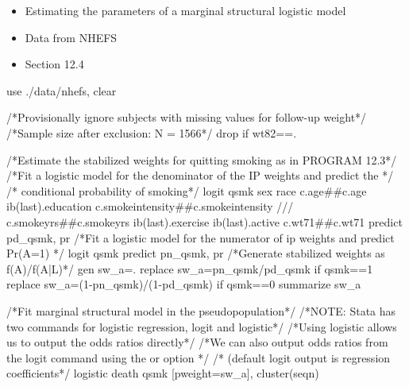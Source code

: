 \documentclass[
  10pt,
  a4paper,
]{book}
\newenvironment{Shaded}{\begin{snugshade}}{\end{snugshade}}
\newcommand{\AlertTok}[1]{\textcolor[rgb]{0.68,0.00,0.00}{#1}}
\newcommand{\CommentTok}[1]{\textcolor[rgb]{0.37,0.37,0.37}{#1}}
\newcommand{\FunctionTok}[1]{\textcolor[rgb]{0.28,0.35,0.67}{#1}}
\newcommand{\KeywordTok}[1]{\textcolor[rgb]{0.00,0.46,0.62}{#1}}
\newcommand{\NormalTok}[1]{\textcolor[rgb]{0.00,0.46,0.62}{#1}}
\providecommand{\tightlist}{%
  \setlength{\itemsep}{0pt}\setlength{\parskip}{0pt}}
\begin{document}
\begin{itemize}
\tightlist
\item
  Estimating the parameters of a marginal structural logistic model
\item
  Data from NHEFS
\item
  Section 12.4
\end{itemize}

\begin{Shaded}
\begin{Highlighting}[]
\KeywordTok{use}\NormalTok{ ./}\KeywordTok{data}\NormalTok{/nhefs, }\KeywordTok{clear}

\CommentTok{/*Provisionally ignore subjects with missing values for follow{-}up weight*/}
\CommentTok{/*Sample size after exclusion: N = 1566*/}
\KeywordTok{drop} \KeywordTok{if}\NormalTok{ wt82==.}

\CommentTok{/*Estimate the stabilized weights for quitting smoking as in PROGRAM 12.3*/}
\CommentTok{/*Fit a logistic model for the denominator of the IP weights and predict the */}
\CommentTok{/* conditional probability of smoking*/} 
\KeywordTok{logit}\NormalTok{ qsmk sex race c.age\#\#c.age ib(}\FunctionTok{last}\NormalTok{).education c.smokeintensity\#\#c.smokeintensity }\CommentTok{///}
\NormalTok{c.smokeyrs\#\#c.smokeyrs ib(}\FunctionTok{last}\NormalTok{).exercise ib(}\FunctionTok{last}\NormalTok{).active c.wt71\#\#c.wt71  }
\KeywordTok{predict}\NormalTok{ pd\_qsmk, pr}
\CommentTok{/*Fit a logistic model for the numerator of ip weights and predict Pr(A=1) */} 
\KeywordTok{logit}\NormalTok{ qsmk }
\KeywordTok{predict}\NormalTok{ pn\_qsmk, pr}
\CommentTok{/*Generate stabilized weights as f(A)/f(A|L)*/}
\KeywordTok{gen}\NormalTok{ sw\_a=.}
\KeywordTok{replace}\NormalTok{ sw\_a=pn\_qsmk/pd\_qsmk }\KeywordTok{if}\NormalTok{ qsmk==1}
\KeywordTok{replace}\NormalTok{ sw\_a=(1{-}pn\_qsmk)/(1{-}pd\_qsmk) }\KeywordTok{if}\NormalTok{ qsmk==0}
\KeywordTok{summarize}\NormalTok{ sw\_a}

\CommentTok{/*Fit marginal structural model in the pseudopopulation*/}
\CommentTok{/*}\AlertTok{NOTE}\CommentTok{: Stata has two commands for logistic regression, logit and logistic*/}
\CommentTok{/*Using logistic allows us to output the odds ratios directly*/}
\CommentTok{/*We can also output odds ratios from the logit command using the or option */}
\CommentTok{/* (default logit output is regression coefficients*/}
\KeywordTok{logistic}\NormalTok{ death qsmk [}\KeywordTok{pweight}\NormalTok{=sw\_a], }\KeywordTok{cluster}\NormalTok{(seqn) }
\end{Highlighting}
\end{Shaded}
\end{document}
